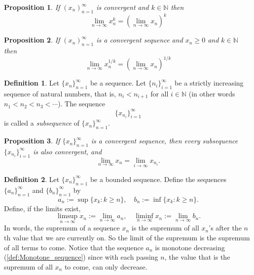 \documentclass{article}
\newtheorem{proposition}{Proposition}[section]
\theoremstyle{definition}
\newtheorem{definition}{Definition}[section]
\theoremstyle{remark}
\begin{document}
\begin{proposition}
If $ (x_n)^\infty_{n=1}$ is convergent and $ k \in \mathbb{N}$ then
\[
\lim_{n \to \infty}{x_n^k} = \left( \lim_{n \to \infty}{x_n}\right)^k
\]
\end{proposition}




\begin{proposition}
If $ (x_n)^\infty_{n=1}$ is a convergent sequence and $ x_n \geq 0 $ and $ k \in \mathbb{N}$ then
\[
\lim_{n \to \infty}{x_n^{1/k}} = \left( \lim_{n \to \infty}{x_n}\right)^{1/k}
\]
\end{proposition}







\begin{definition} \label{def:subsequence}
Let \( \{x_n\}_{n=1}^{\infty} \) be a sequence. Let \( \{n_i\}_{i=1}^{\infty} \) be a strictly increasing sequence of natural numbers, that is, \( n_i < n_{i+1} \) for all \( i \in \mathbb{N} \) (in other words \( n_1 < n_2 < n_3 < \cdots \)). The sequence
\[
\{x_{n_i}\}_{i=1}^{\infty}
\]
is called a \textit{subsequence} of \( \{x_n\}_{n=1}^{\infty} \).
\end{definition}




\begin{proposition} \label{prp:subsequence limit equal to limit}
If \( \{x_n\}_{n=1}^{\infty} \) is a convergent sequence, then every subsequence \( \{x_{n_i}\}_{i=1}^{\infty} \) is also convergent, and
\[
\lim_{n \to \infty} x_n = \lim_{i \to \infty} x_{n_i}.
\]
\end{proposition}







\begin{definition} \label{def:limsup_liminf}
Let \( \{x_n\}_{n=1}^{\infty} \) be a bounded sequence. Define the sequences \( \{a_n\}_{n=1}^{\infty} \) and \( \{b_n\}_{n=1}^{\infty} \) by
\[
a_n := \sup\{ x_k : k \geq n \}, \quad b_n := \inf\{ x_k : k \geq n \}.
\]
Define, if the limits exist,
\[
\limsup_{n \to \infty} x_n := \lim_{n \to \infty} a_n, \quad \liminf_{n \to \infty} x_n := \lim_{n \to \infty} b_n.
\]
In words, the supremum of a sequence $x_n$ is the supremum of all $x_n$'s after the $n$th value that we are currently on. So the limit of the supremum is the supremum of all terms to 
come. Notice that the sequence $a_n$ is monotone decreasing (\ref{def:Monotone_sequence}) since 
with each passing $n$, the value that is the supremum of all $x_n$ to come,
can only decrease. 


\end{definition}
\end{document}
